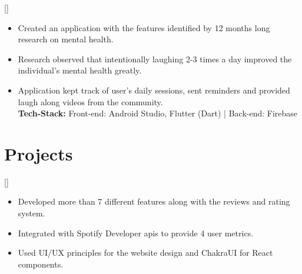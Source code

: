 \documentclass{article}
\begin{document}
[]
\begin{itemize}
    \item Created an application with the features identified by 12 months long research on mental health.
    \item Research observed that intentionally laughing 2-3 times a day improved the individual's mental health greatly.
    \item Application kept track of user's daily sessions, sent reminders and provided laugh along videos from the community.\\
\textbf{Tech-Stack:} 
Front-end: Android Studio, Flutter (Dart) | Back-end: Firebase
\end{itemize}





 
\section{Projects}


[] 
\item
\begin{itemize}
\item Developed more than 7 different features along with the reviews and rating system.
\item Integrated with Spotify Developer apis to provide 4 user metrics.
\item Used UI/UX principles for the website design and ChakraUI for React components.

\end{itemize}
\end{document}
